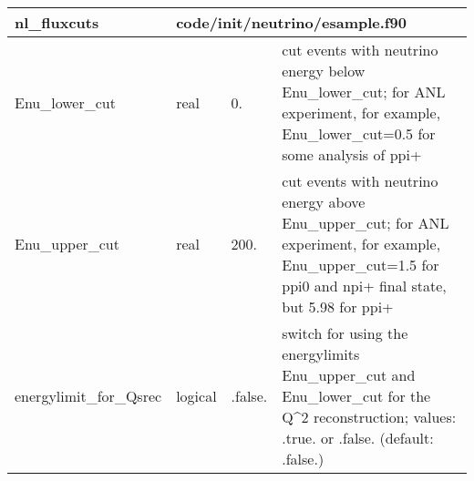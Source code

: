 \documentclass{article}
\begin{document}
\begin{longtable}{llll}
\toprule
\textbf{\large{nl\_fluxcuts}} & \multicolumn{3}{l}{\footnotesize{code/init/neutrino/esample.f90}}\\*
\midrule
\endfirsthead
\midrule
\endhead
Enu\_lower\_cut & \begin{minipage}[t]{2cm}real\end{minipage} & \begin{minipage}[t]{2cm}0.\end{minipage} & \begin{minipage}[t]{12cm}cut events with neutrino energy below Enu\_lower\_cut; for ANL experiment, for example, Enu\_lower\_cut=0.5 for some analysis of ppi+\end{minipage}\\*
\midrule
Enu\_upper\_cut & \begin{minipage}[t]{2cm}real\end{minipage} & \begin{minipage}[t]{2cm}200.\end{minipage} & \begin{minipage}[t]{12cm}cut events with neutrino energy above Enu\_upper\_cut; for ANL experiment, for example, Enu\_upper\_cut=1.5 for ppi0 and npi+ final state, but 5.98 for ppi+\end{minipage}\\*
\midrule
energylimit\_for\_Qsrec & \begin{minipage}[t]{2cm}logical\end{minipage} & \begin{minipage}[t]{2cm}.false.\end{minipage} & \begin{minipage}[t]{12cm}switch for using the energylimits Enu\_upper\_cut and Enu\_lower\_cut for the Q\^{}2 reconstruction; values: .true. or .false.  (default: .false.)\end{minipage}\\*
\bottomrule
\end{longtable}
{ }



\end{document}
